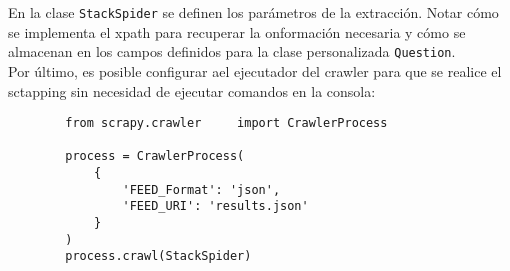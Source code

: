     En la clase \texttt{StackSpider} se definen los parámetros de la extracción. Notar cómo se implementa el xpath para recuperar la onformación necesaria y cómo se almacenan en los campos definidos para la clase personalizada \texttt{Question}. \\

    Por último, es posible configurar ael ejecutador del crawler para que se realice el sctapping sin necesidad de ejecutar comandos en la consola:

    \begin{verbatim}
        from scrapy.crawler     import CrawlerProcess
                       
        process = CrawlerProcess(
            {
                'FEED_Format': 'json',
                'FEED_URI': 'results.json'
            }
        )
        process.crawl(StackSpider)
    \end{verbatim}

    